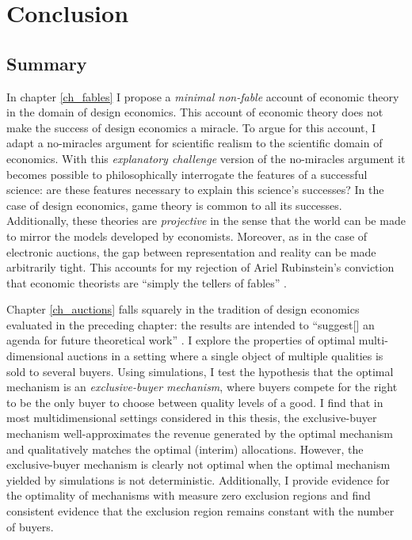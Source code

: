 \chapter{Conclusion}

\section{Summary}

In chapter \ref{ch_fables} I propose a \textit{minimal non-fable} account of economic theory in the domain of design economics. This account of economic theory does not make the success of design economics a miracle. To argue for this account, I adapt a no-miracles argument for scientific realism to the scientific domain of economics. With this \textit{explanatory challenge} version of the no-miracles argument it becomes possible to philosophically interrogate the features of a successful science: are these features necessary to explain this science's successes? In the case of design economics, game theory is common to all its successes. Additionally, these theories are \textit{projective} \autocite{guala2001} in the sense that the world can be made to mirror the models developed by economists. Moreover, as in the case of electronic auctions, the gap between representation and reality can be made arbitrarily tight. This accounts for my rejection of Ariel Rubinstein's conviction that economic theorists are ``simply the tellers of fables'' \autocite[882]{rubinstein2006}.

Chapter \ref{ch_auctions} falls squarely in the tradition of design economics evaluated in the preceding chapter: the results are intended to ``suggest[] an agenda for future theoretical work'' \autocite[p1363]{roth2002}. I explore the properties of optimal multi-dimensional auctions in a setting where a single object of multiple qualities is sold to several buyers. Using simulations, I test the hypothesis that the optimal mechanism is an \textit{exclusive-buyer mechanism}, where buyers compete for the right to be the only buyer to choose between quality levels of a good. I find that in most multidimensional settings considered in this thesis, the exclusive-buyer mechanism well-approximates the revenue generated by the optimal mechanism and qualitatively matches the optimal (interim) allocations. However, the exclusive-buyer mechanism is clearly not optimal when the optimal mechanism yielded by simulations is not deterministic. Additionally, I provide evidence for the optimality of mechanisms with measure zero exclusion regions and find consistent evidence that the exclusion region remains constant with the number of buyers.

